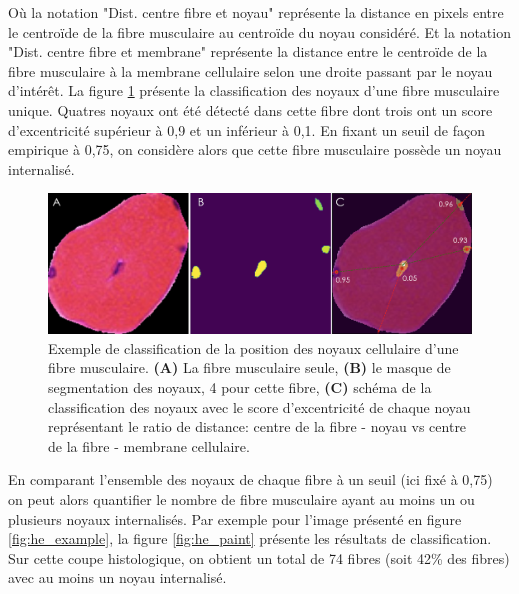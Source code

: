 Où la notation "Dist. centre fibre et noyau" représente la distance en pixels entre le centroïde de la fibre musculaire au centroïde du noyau considéré. Et la notation "Dist. centre fibre et membrane" représente la distance entre le centroïde de la fibre musculaire à la membrane cellulaire selon une droite passant par le noyau d'intérêt. La figure \ref{fig:he_single_nuc}  présente la classification des noyaux d'une fibre musculaire unique. Quatres noyaux ont été détecté dans cette fibre dont trois ont un score d'excentricité supérieur à 0,9 et un inférieur à 0,1. En fixant un seuil de façon empirique à 0,75, on considère alors que cette fibre musculaire possède un noyau internalisé.
\begin{figure}[htbp]
 \centering
 \includegraphics[width=1\textwidth]{figures/he_single_nuc.png}
 \caption[Exemple de classification de la position des noyaux]{Exemple de classification de la position des noyaux cellulaire d'une fibre musculaire. \textbf{(A)} La fibre musculaire seule,\textbf{ (B)} le masque de segmentation des noyaux, 4 pour cette fibre,\textbf{ (C)} schéma de la classification des noyaux avec le score d'excentricité de chaque noyau représentant le ratio de distance: centre de la fibre - noyau vs centre de la fibre - membrane cellulaire.}
 \label{fig:he_single_nuc}
\end{figure}
En comparant l'ensemble des noyaux de chaque fibre à un seuil (ici fixé à 0,75) on peut alors quantifier le nombre de fibre musculaire ayant au moins un ou plusieurs noyaux internalisés. Par exemple pour l'image présenté en figure \ref{fig:he_example}, la figure \ref{fig:he_paint} présente les résultats de classification. Sur cette coupe histologique, on obtient un total de 74 fibres (soit 42\% des fibres) avec au moins un noyau internalisé.
